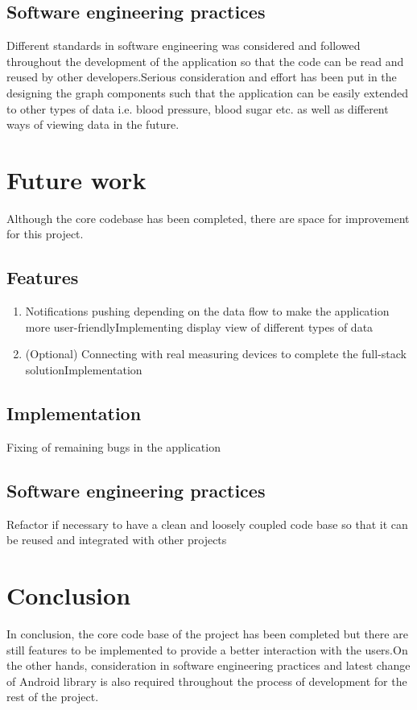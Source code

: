 \subsection{Software engineering practices}

Different standards in software engineering was considered and followed throughout the development of the application so
that the code can be read and reused by other developers.Serious consideration and effort has been put in the designing
the graph components such that the application can be easily extended to other types of data i.e. blood pressure, blood
sugar etc. as well as different ways of viewing data in the future.

\section{Future work} \label{sec:Work done so far}

Although the core codebase has been completed, there are space for improvement for this project.  \subsection{Features}

\begin{enumerate} \item Notifications pushing depending on the data flow to make the application more
user-friendlyImplementing display view of different types of data\item (Optional) Connecting with real measuring devices
to complete the full-stack solutionImplementation \end{enumerate}

\subsection{Implementation}

Fixing of remaining bugs in the application

\subsection{Software engineering practices} Refactor if necessary to have a clean and loosely coupled code base so that
it can be reused and integrated with other projects

\section{Conclusion} In conclusion, the core code base of the project has been completed but there are still features to
be implemented to provide a better interaction with the users.On the other hands, consideration in software engineering
practices and latest change of Android library is also required throughout the process of development for the rest of
the project.  
